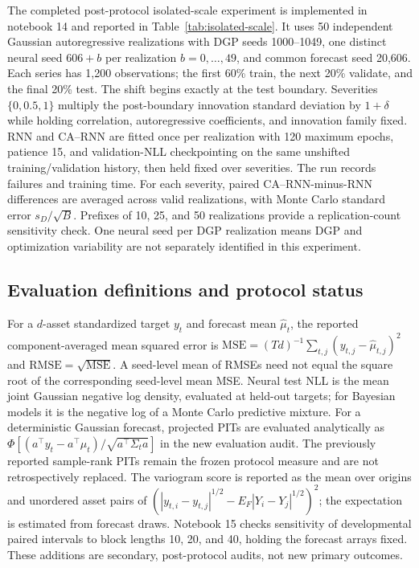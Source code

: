 \documentclass[11pt]{article}
\begin{document}
The completed post-protocol isolated-scale experiment is implemented in notebook
14 and reported in Table~\ref{tab:isolated-scale}. It uses 50 independent
Gaussian autoregressive realizations with DGP seeds 1000--1049, one distinct
neural seed $606+b$ per realization $b=0,\ldots,49$, and common forecast seed
20,606. Each series has 1,200 observations; the first 60\% train, the next
20\% validate, and the final 20\% test. The shift begins exactly at the test
boundary. Severities $\{0,0.5,1\}$ multiply the post-boundary innovation
standard deviation by $1+\delta$ while holding correlation, autoregressive
coefficients, and innovation family fixed. RNN and CA--RNN are fitted once per
realization with 120 maximum epochs, patience 15, and validation-NLL
checkpointing on the same unshifted training/validation history, then held fixed
over severities. The run records failures and training time. For each severity,
paired CA--RNN-minus-RNN differences are averaged across valid realizations,
with Monte Carlo standard error $s_D/\sqrt{B}$. Prefixes of 10, 25, and 50
realizations provide a replication-count sensitivity check. One neural seed
per DGP realization means DGP and optimization variability are not separately
identified in this experiment.

\subsection{Evaluation definitions and protocol status}

For a $d$-asset standardized target $y_t$ and forecast mean $\widehat\mu_t$,
the reported component-averaged mean squared error is
$\mathrm{MSE}=(Td)^{-1}\sum_{t,j}(y_{t,j}-\widehat\mu_{t,j})^2$ and
$\mathrm{RMSE}=\sqrt{\mathrm{MSE}}$. A seed-level mean of RMSEs need not equal
the square root of the corresponding seed-level mean MSE. Neural test NLL is
the mean joint Gaussian negative log density, evaluated at held-out targets;
for Bayesian models it is the negative log of a Monte Carlo predictive mixture.
For a deterministic Gaussian forecast, projected PITs are evaluated analytically
as $\Phi[(a^\top y_t-a^\top\mu_t)/\sqrt{a^\top\Sigma_t a}]$ in the new
evaluation audit. The previously reported sample-rank PITs remain the frozen
protocol measure and are not retrospectively replaced. The variogram score is
reported as the mean over origins and unordered asset pairs of
$(|y_{t,i}-y_{t,j}|^{1/2}-E_F|Y_i-Y_j|^{1/2})^2$; the expectation is estimated
from forecast draws. Notebook 15 checks sensitivity of developmental paired
intervals to block lengths 10, 20, and 40, holding the forecast arrays fixed.
These additions are secondary, post-protocol audits, not new primary outcomes.
\end{document}
